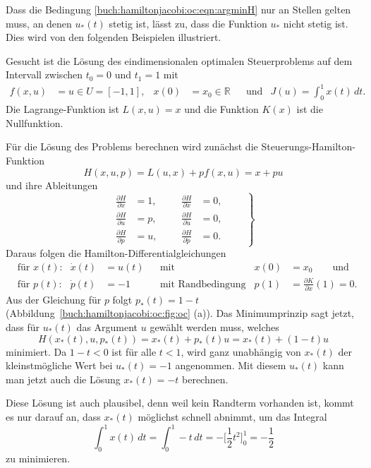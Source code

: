 Dass die Bedingung \eqref{buch:hamiltonjacobi:oc:eqn:argminH} nur
an Stellen gelten muss, an denen $u_*(t)$ stetig ist, lässt zu,
dass die Funktion $u_*$ nicht stetig ist.
Dies wird von den folgenden Beispielen illustriert.



\begin{beispiel}
\label{buch:hamiltonjacobi:oc:bsp:simple}
Gesucht ist die Lösung des eindimensionalen optimalen Steuerproblems
auf dem Intervall zwischen $t_0=0$ und $t_1=1$ mit
\begin{align*}
f(x,u) &= u\in U=[-1,1],
&
x(0) &= x_0\in\mathbb{R}
&
&\text{und}&
J(u)
=
\int_0^1 x(t)\,dt.
\end{align*}
Die Lagrange-Funktion ist $L(x,u)=x$ und die Funktion $K(x)$ ist die
Nullfunktion.

Für die Lösung des Problems berechnen wird zunächst die
Steuerungs-Hamilton-Funktion
\[
H(x,u,p)
=
L(u,x) + pf(x,u)
=
x + pu
\]
und ihre Ableitungen
\begin{equation}
\left.
\begin{aligned}
\frac{\partial H}{\partial x}
&=
1,
&&&
\frac{\partial H}{\partial\dot{x}}
&=
0,
\\
\frac{\partial H}{\partial u}
&=
p,
&&&
\frac{\partial H}{\partial\dot{u}}
&=
0,
\\
\frac{\partial H}{\partial p}
&=
u,
&&&
\frac{\partial H}{\partial\dot{p}}
&=
0.
\end{aligned}
\qquad
\right\}
\label{buch:hamiltonjacobi:oc:bsp:ableitungen}
\end{equation}
Daraus folgen die Hamilton-Differentialgleichungen
\begin{align*}
&\text{für $x(t)$:}&
\dot{x}(t)&=u(t)
&&\text{mit Anfangsbedingung}&
x(0)&=x_0
\qquad\text{und}
\\
&\text{für $p(t)$:}&
\dot{p}(t)&=-1
&&\text{mit Randbedingung}&
p(1)&=\frac{\partial K}{\partial x}(1) = 0.
\end{align*}
Aus der Gleichung für $p$ folgt $p_*(t)=1-t$
(Abbildung~\ref{buch:hamiltonjacobi:oc:fig:oc} (a)).
Das Minimumprinzip sagt jetzt, dass für $u_*(t)$ das Argument $u$
gewählt werden muss, welches
\[
H(x_*(t),u,p_*(t))
=
x_*(t)+p_*(t)u
=
x_*(t)+(1-t)u
\]
minimiert.
Da $1-t<0$ ist für alle $t<1$, wird ganz unabhängig von $x_*(t)$
der kleinstmögliche Wert bei $u_*(t)=-1$ angenommen.
Mit diesem $u_*(t)$ kann man jetzt auch die Lösung $x_*(t)=-t$
berechnen.

Diese Lösung ist auch plausibel, denn weil kein Randterm vorhanden ist,
kommt es nur darauf an, dass $x_*(t)$ möglichst schnell abnimmt, um
das Integral
\[
\int_0^1 x(t)\,dt
=
\int_0^1 -t\,dt
=
-\biggl[\frac12t^2\biggr]_0^1
=
-\frac12
\]
zu minimieren.
\end{beispiel}

